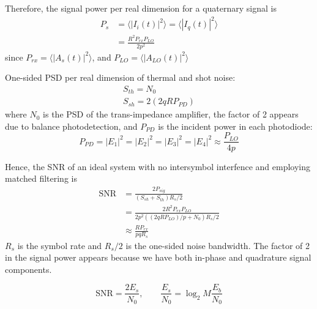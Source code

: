 \documentclass[a4paper]{article}
\begin{document}
Therefore, the signal power per real dimension for a quaternary signal is
\begin{align} \nonumber
P_{s} &= \langle|I_i(t)|^2\rangle = \langle|I_q(t)|^2\rangle \\
&= \frac{R^2P_{rx}P_{LO}}{2p^2}
\end{align}
since $P_{rx} = \langle|A_s(t)|^2\rangle$, and $P_{LO} = \langle|A_{LO}(t)|^2\rangle$

One-sided PSD per real dimension of thermal and shot noise:
\begin{align}
S_{th} = N_0 \\
S_{sh} = 2(2qRP_{PD})
\end{align}
where $N_0$ is the PSD of the trans-impedance amplifier, the factor of 2 appears due to balance photodetection, and $P_{PD}$ is the incident power in each photodiode:
\begin{equation}
P_{PD} = |E_1|^2 = |E_2|^2 = |E_3|^2 = |E_4|^2 \approx \frac{P_{LO}}{4p}
\end{equation}

Hence, the SNR of an ideal system with no intersymbol interfence and employing matched filtering is 
\begin{align} \nonumber
\mathrm{SNR} & = \frac{2P_{sig}}{(S_{sh} + S_{th})R_s/2} \\ \nonumber
&= \frac{2R^2P_{rx}P_{LO}}{2p^2((2qRP_{LO})/p + N_0)R_s/2} \\
&\approx \frac{RP_{rx}}{pqR_s} 
\end{align}
$R_s$ is the symbol rate and $R_s/2$ is the one-sided noise bandwidth. The factor of 2 in the signal power appears because we have both in-phase and quadrature signal components.

\begin{equation}
\mathrm{SNR} = \frac{2E_s}{N_0}, \qquad \frac{E_s}{N_0} = \log_2M\frac{E_b}{N_0}
\end{equation}
\end{document}
